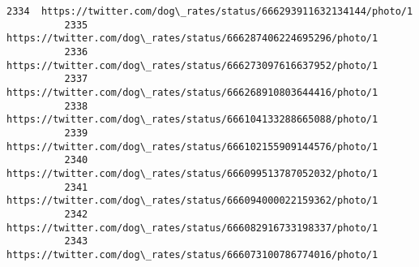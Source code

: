 \documentclass[11pt]{article}
\begin{document}
\begin{Verbatim}[commandchars=\\\{\}]
          2334  https://twitter.com/dog\_rates/status/666293911632134144/photo/1                                                                                                                                                                                                   
          2335  https://twitter.com/dog\_rates/status/666287406224695296/photo/1                                                                                                                                                                                                   
          2336  https://twitter.com/dog\_rates/status/666273097616637952/photo/1                                                                                                                                                                                                   
          2337  https://twitter.com/dog\_rates/status/666268910803644416/photo/1                                                                                                                                                                                                   
          2338  https://twitter.com/dog\_rates/status/666104133288665088/photo/1                                                                                                                                                                                                   
          2339  https://twitter.com/dog\_rates/status/666102155909144576/photo/1                                                                                                                                                                                                   
          2340  https://twitter.com/dog\_rates/status/666099513787052032/photo/1                                                                                                                                                                                                   
          2341  https://twitter.com/dog\_rates/status/666094000022159362/photo/1                                                                                                                                                                                                   
          2342  https://twitter.com/dog\_rates/status/666082916733198337/photo/1                                                                                                                                                                                                   
          2343  https://twitter.com/dog\_rates/status/666073100786774016/photo/1                                                                                                                                                                                                   

\end{Verbatim}
\end{document}
